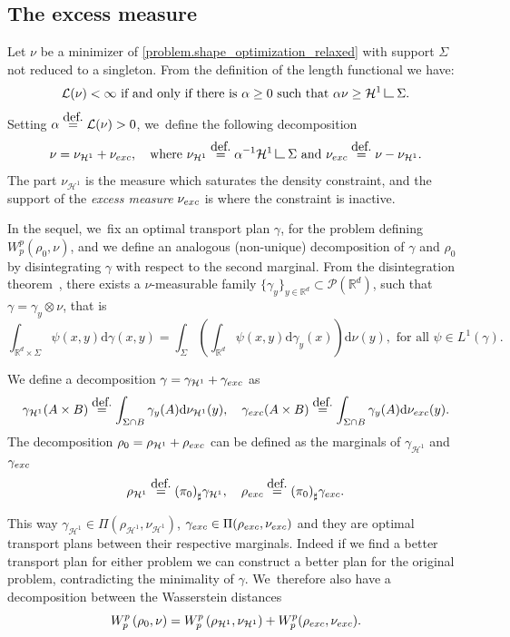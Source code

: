 \documentclass[11pt]{article}
\numberwithin{equation}{section}
\theoremstyle{definition}
\newcommand{\eqdef}{\ensuremath{\stackrel{\mbox{\upshape\tiny def.}}{=}}}
\newcommand\LM[1]{\hbox{\vrule width.5pt \vbox to#1pt{\vfill \hrule width#1pt height.5pt}}}
\newcommand\LL{{\mathchoice {\>\LM7\>}{\>\LM7\>}{\,\LM5\,}{\,\LM{3.35}\,}}}
\newcommand{\mres}{\LL}
\newcommand\cH{\mathcal{H}}
\newcommand{\RR}{\mathbb{R}}
\newcommand{\nuexc}{\nu_{\textup{exc}}}
\newcommand{\nuH}{\nu_{\cH^1}}
\newcommand{\rhoexc}{\rho_{\textup{exc}}}
\newcommand{\rhoH}{\rho_{\cH^1}}
\newcommand{\gammaexc}{\gamma_{\textup{exc}}}
\newcommand{\gammaH}{\gamma_{\cH^1}}
\newcommand\dd{\mathrm{d}}
\begin{document}
\subsection{The excess measure}
Let $\nu$ be a minimizer of \eqref{problem.shape_optimization_relaxed} with support
$\Sigma$ not reduced to a singleton. From the definition of the length functional we have:
\[
\mathcal{L}(\nu) < \infty \text{ if and only if there is $\alpha \ge 0$ such that } \alpha\nu \ge \cH^1\mres \Sigma.
\]
Setting $\alpha \eqdef \mathcal{L}(\nu)>0$, we~define the following decomposition
\begin{equation}\label{nuexceed}
\nu = \nuH + \nuexc,\quad
\text{where $\nuH \eqdef \alpha^{-1}\cH^1\mres \Sigma$ and $\nuexc \eqdef \nu - \nuH$}.
\end{equation}
The part $\nuH$ is the measure which saturates the density constraint, and the support of the \emph{excess measure} $\nuexc$ is where the constraint is inactive.

In the sequel, we~fix an optimal transport plan $\gamma$, for the problem defining $W_p^p(\rho_0, \nu)$, and we define an analogous (non-unique) decomposition of $\gamma$ and $\rho_0$ by disintegrating $\gamma$ with respect to the second marginal. From the disintegration theorem~\cite[Th.\,2.28]{ambrosio2000functions}, there exists a $\nu$-measurable family $\{\gamma_{y}\}_{y\in \RR^d} \subset \mathcal{P}(\RR^d)$, such that $\gamma= \gamma_y\otimes\nu$, that is\vspace*{-3pt}
\begin{equation}\label{disintegration_formula}
\int_{\RR^d \times \Sigma}
\psi(x, y)\dd \gamma(x,y)
=
\int_\Sigma
\left(
\int_{\RR^d} \psi(x,y)\dd \gamma_y(x)
\right)\dd\nu(y), \text{ for all $\psi \in L^1(\gamma)$}.
\end{equation}

We define a decomposition $\gamma = \gammaH + \gammaexc$ as
\begin{equation}\label{gammaexceed}
\gammaH(A\times B)\eqdef
\int_{\Sigma \cap B}
\gamma_y(A)
\dd\nuH(y),
\quad
\gammaexc(A\times B)\eqdef
\int_{\Sigma \cap B}
\gamma_y(A)
\dd\nuexc(y).
\end{equation}
The decomposition $\rho_0 = \rhoH + \rhoexc$ can be defined as the marginals of $\gammaH$ and $\gammaexc$
\begin{equation}\label{rhoexceed}
\rhoH \eqdef {(\pi_{0})}_\sharp \gammaH,
\quad
\rhoexc \eqdef {(\pi_{0})}_\sharp \gammaexc.
\end{equation}

This way $\gammaH \in \Pi(\rhoH, \nuH)$, $\gammaexc \in \Pi(\rhoexc, \nuexc)$ and they are optimal transport plans between their respective marginals. Indeed if we find a better transport plan for either problem we can construct a better plan for the original problem, contradicting the minimality of $\gamma$. We~therefore also have a decomposition between the Wasserstein distances\vspace*{-3pt}
\begin{equation}\label{rhoexc_decomposition_wasserstein}
W_p^p\left(\rho_0, \nu\right)
=
W_p^p\left(\rhoH, \nuH\right)
+
W_p^p(\rhoexc, \nuexc).
\end{equation}
\end{document}
